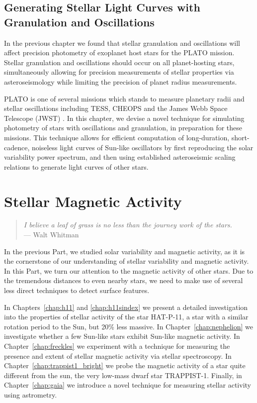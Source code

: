 \documentclass[12pt, twoside]{uwthesis}
\begin{document}


\chapter{Generating Stellar Light Curves with Granulation and Oscillations} \label{chap:astero}

In the previous chapter we found that stellar granulation and oscillations will affect precision photometry of exoplanet host stars for the PLATO mission. Stellar granulation and oscillations should occur on all planet-hosting stars, simultaneously allowing for precision measurements of stellar properties via asteroseismology while limiting the precision of planet radius measurements. 

PLATO is one of several missions which stands to measure planetary radii and stellar oscillations including TESS, CHEOPS and the James Webb Space Telescope (JWST) \citep{Ricker2014,Broeg2013,Beichman2014}. In this chapter, we devise a novel technique for simulating photometry of stars with oscillations and granulation, in preparation for these missions. This technique allows for efficient computation of long-duration, short-cadence, noiseless light curves of Sun-like oscillators by first reproducing the solar variability power spectrum, and then using established asteroseismic scaling relations to generate light curves of other stars. 

\part{Stellar Magnetic Activity} \label{part:activity}

\begin{verse}
{\it I believe a leaf of grass is no less than the journey work of the stars.\\}
\hfill --- Walt Whitman
\end{verse}

In the previous Part, we studied solar variability and magnetic activity, as it is the cornerstone of our understanding of stellar variability and magnetic activity. In this Part, we turn our attention to the magnetic activity of other stars. Due to the tremendous distances to even nearby stars, we need to make use of several less direct techniques to detect surface features. 

In Chapters~\ref{chap:h11} and \ref{chap:h11sindex} we present a detailed investigation into the properties of stellar activity of the star HAT-P-11, a star with a similar rotation period to the Sun, but 20\% less massive. In Chapter~\ref{chap:nephelion} we investigate whether a few Sun-like stars exhibit Sun-like magnetic activity. In Chapter~\ref{chap:freckles} we experiment with a technique for measuring the presence and extent of stellar magnetic activity via stellar spectroscopy. In Chapter~\ref{chap:trappist1_bright} we probe the magnetic activity of a star quite different from the sun, the very low-mass dwarf star TRAPPIST-1. Finally, in Chapter~\ref{chap:gaia} we introduce a novel technique for measuring stellar activity using astrometry. 
\end{document}
